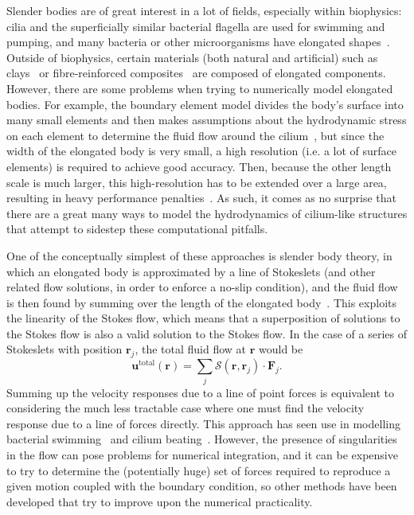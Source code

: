 Slender bodies are of great interest in a lot of fields, especially within biophysics: cilia and the superficially similar bacterial flagella are used for swimming and pumping, and many bacteria or other microorganisms have elongated shapes~. Outside of biophysics, certain materials (both natural and artificial) such as clays~ or fibre-reinforced composites~\cite{borker_slender_2019} are composed of elongated components. However, there are some problems when trying to numerically model elongated bodies. For example, the boundary element model divides the body's surface into many small elements and then makes assumptions about the hydrodynamic stress on each element to determine the fluid flow around the cilium~, but since the width of the elongated body is very small, a high resolution (i.e. a lot of surface elements) is required to achieve good accuracy. Then, because the other length scale is much larger, this high-resolution has to be extended over a large area, resulting in heavy performance penalties~\cite{koens_tubular-body_2022}. As such, it comes as no surprise that there are a great many ways to model the hydrodynamics of cilium-like structures that attempt to sidestep these computational pitfalls.

One of the conceptually simplest of these approaches is slender body theory, in which an elongated body is approximated by a line of Stokeslets (and other related flow solutions, in order to enforce a no-slip condition), and the fluid flow is then found by summing over the length of the elongated body~\cite{guazzelli_physical_2011}. This exploits the linearity of the Stokes flow, which means that a superposition of solutions to the Stokes flow is also a valid solution to the Stokes flow. In the case of a series of Stokeslets with position $\mathbf{r}_j$, the total fluid flow at $\mathbf{r}$ would be
\begin{equation}
    \mathbf{u}^\text{total}(\mathbf{r}) = \sum_j \mathcal{S}(\mathbf{r}, \mathbf{r}_j) \cdot \mathbf{F}_j.
\end{equation}
Summing up the velocity responses due to a line of point forces is equivalent to considering the much less tractable case where one must find the velocity response due to a line of forces directly. This approach has seen use in modelling bacterial swimming~ and cilium beating~. However, the presence of singularities in the flow can pose problems for numerical integration, and it can be expensive to try to determine the (potentially huge) set of forces required to reproduce a given motion coupled with the boundary condition, so other methods have been developed that try to improve upon the numerical practicality. %

